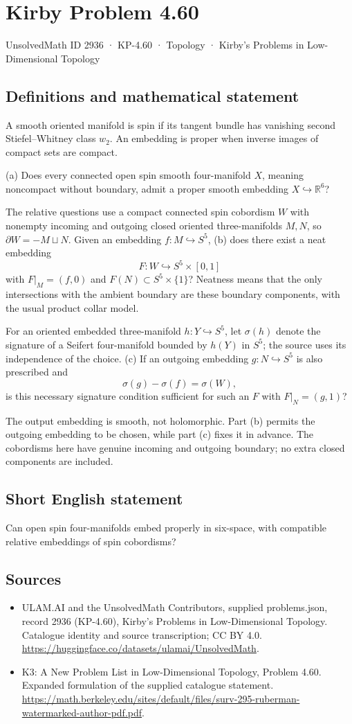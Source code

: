 \documentclass[11pt,a4paper]{article}
\begin{document}
\section*{Kirby Problem 4.60}\label{2936}
{\small UnsolvedMath ID 2936 · KP-4.60 · Topology · Kirby's Problems in Low-Dimensional Topology}
\subsection{Definitions and mathematical statement}
A smooth oriented manifold is spin if its tangent bundle has vanishing second Stiefel--Whitney class $w_2$. An embedding is proper when inverse images of compact sets are compact.

(a) Does every connected open spin smooth four-manifold $X$, meaning noncompact without boundary, admit a proper smooth embedding $X\hookrightarrow\mathbb R^6$?

The relative questions use a compact connected spin cobordism $W$ with nonempty incoming and outgoing closed oriented three-manifolds $M,N$, so $\partial W=-M\sqcup N$. Given an embedding $f:M\hookrightarrow S^5$, (b) does there exist a neat embedding
\[
F:W\hookrightarrow S^5\times[0,1]
\]
with $F|_M=(f,0)$ and $F(N)\subset S^5\times\{1\}$? Neatness means that the only intersections with the ambient boundary are these boundary components, with the usual product collar model.

For an oriented embedded three-manifold $h:Y\hookrightarrow S^5$, let $\sigma(h)$ denote the signature of a Seifert four-manifold bounded by $h(Y)$ in $S^5$; the source uses its independence of the choice. (c) If an outgoing embedding $g:N\hookrightarrow S^5$ is also prescribed and
\[
\sigma(g)-\sigma(f)=\sigma(W),
\]
is this necessary signature condition sufficient for such an $F$ with $F|_N=(g,1)$?

The output embedding is smooth, not holomorphic. Part (b) permits the outgoing embedding to be chosen, while part (c) fixes it in advance. The cobordisms here have genuine incoming and outgoing boundary; no extra closed components are included.
\subsection{Short English statement}
Can open spin four-manifolds embed properly in six-space, with compatible relative embeddings of spin cobordisms?
\subsection{Sources}
\begin{itemize}
\item[S1] ULAM.AI and the UnsolvedMath Contributors, supplied problems.json, record 2936 (KP-4.60), Kirby's Problems in Low-Dimensional Topology. Catalogue identity and source transcription; CC BY 4.0.
\url{https://huggingface.co/datasets/ulamai/UnsolvedMath}.
\item[S2] K3: A New Problem List in Low-Dimensional Topology, Problem 4.60. Expanded formulation of the supplied catalogue statement.
\url{https://math.berkeley.edu/sites/default/files/surv-295-ruberman-watermarked-author-pdf.pdf}.
\end{itemize}
\end{document}

